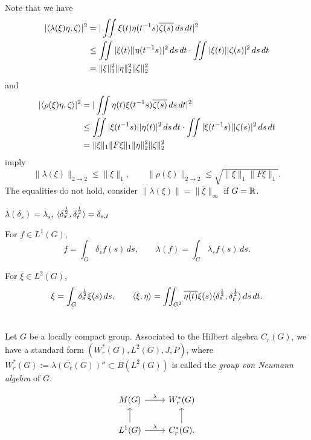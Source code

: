 \documentclass{../../large}
\begin{document}
Note that we have
\begin{align*}
|\langle\lambda(\xi)\eta,\zeta\rangle|^2
&=|\iint\xi(t)\eta(t^{-1}s)\overline{\zeta(s)}\,ds\,dt|^2\\
&\le\iint|\xi(t)||\eta(t^{-1}s)|^2\,ds\,dt\cdot\iint|\xi(t)||\zeta(s)|^2\,ds\,dt\\
&=\|\xi\|_1^2\|\eta\|_2^2\|\zeta\|_2^2
\end{align*}
and
\begin{align*}
|\langle\rho(\xi)\eta,\zeta\rangle|^2
&=|\iint\eta(t)\xi(t^{-1}s)\overline{\zeta(s)}\,ds\,dt|^2\\
&\le\iint|\xi(t^{-1}s)||\eta(t)|^2\,ds\,dt\cdot\iint|\xi(t^{-1}s)||\zeta(s)|^2\,ds\,dt\\
&=\|\xi\|_1\|F\xi\|_1\|\eta\|_2^2\|\zeta\|_2^2
\end{align*}
imply
\[\|\lambda(\xi)\|_{2\to2}\le\|\xi\|_1,\qquad\|\rho(\xi)\|_{2\to2}\le\sqrt{\|\xi\|_1\|F\xi\|_1}.\]
The equalities do not hold, consider $\|\lambda(\xi)\|=\|\hat\xi\|_\infty$ if $G=\mathbb{R}$.





\begin{prb}
$\lambda(\delta_s)=\lambda_s$, $\langle\delta_s^{\frac12},\delta_t^{\frac12}\rangle=\delta_{s,t}$

For $f\in L^1(G)$,
\[f=\int_G\delta_sf(s)\,ds,\qquad \lambda(f)=\int_G\lambda_sf(s)\,ds.\]

For $\xi\in L^2(G)$,
\[\xi=\int_G\delta_s^{\frac12}\xi(s)\,ds,\qquad\langle\xi,\eta\rangle=\iint_{G^2}\overline{\eta(t)}\xi(s)\langle\delta_s^{\frac12},\delta_t^{\frac12}\rangle\,ds\,dt.\]
\end{prb}



\section{}



\begin{prb}
Let $G$ be a locally compact group.
Associated to the Hilbert algebra $C_c(G)$, we have a standard form $(W_r^*(G),L^2(G),J,P)$, where $W_r^*(G):=\lambda(C_c(G))''\subset B(L^2(G))$ is called the \emph{group von Neumann algebra} of $G$.

\[\begin{tikzcd}
M(G) \ar{r}{\lambda} & W_r^*(G) \\
L^1(G) \ar{r}{\lambda}\ar{u} & C_r^*(G) \ar{u}.
\end{tikzcd}\]
\begin{parts}
\item
\end{parts}
\end{prb}
\begin{pf}

\end{pf}
\end{document}
